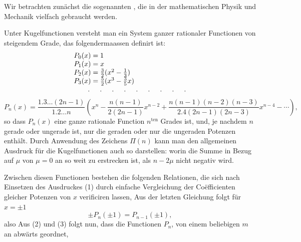 
Wir betrachten zunächst die sogenannten , die in
der mathematischen Physik und Mechanik vielfach gebraucht
werden.

Unter Kugelfunctionen versteht man ein System ganzer rationaler
Functionen von steigendem Grade, das folgendermaassen definirt
ist:
\[
\begin{array}{l}
P_0(x) = 1 \\
P_1(x) = x \\
P_2(x) = \frac{3}{2}(x^2 - \frac{1}{3}) \\
P_3(x) = \frac{5}{2}(x^3 - \frac{3}{5}x) \\
\hbox{\quad\quad . \quad . \quad . \quad . \quad . \quad . \quad . \quad . \quad .}
\end{array}
\]
\[
P_n(x) = \frac{1.3 \ldots (2n-1)}{1.2 \ldots n}
\left(x^n - \frac{n(n-1)}{2(2n-1)}x^{n-2}
+ \frac{n(n-1)(n-2)(n-3)}{2.4(2n-1)(2n-3)}x^{n-4} - \cdots\right),
\]
so dass $P_n(x)$ eine ganze rationale Function $n^{\mathrm{ten}}$
Grades ist, und, je nachdem $n$ gerade oder ungerade ist, nur
die geraden oder nur die ungeraden Potenzen enthält. Durch
Anwendung des Zeichens $\Pi(n)$ kann man den allgemeinen
Ausdruck für die Kugelfunctionen auch so darstellen:
worin die Summe in Bezug auf $\mu$ von $\mu = 0$ an so weit zu
erstrecken ist, als $n - 2\mu$ nicht negativ wird.

Zwischen diesen Functionen bestehen die folgenden Relationen,
die sich nach Einsetzen des Ausdruckes (1) durch einfache
Vergleichung der Coëfficienten gleicher Potenzen von $x$
verificiren lassen,
Aus der letzten Gleichung folgt für $x = \pm 1$
\[
\pm P_n(\pm 1) = P_{n-1}(\pm 1),
\]
also
Aus (2) und (3) folgt nun, dass die Functionen $P_n$, von einem
beliebigen $m$ an abwärts geordnet,
